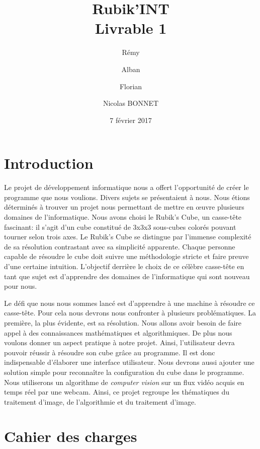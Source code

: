\documentclass[a4paper]{report}
\title{Rubik'INT \\ Livrable 1}
\author{Rémy \bsc{ZIRNHELD} \and Alban \bsc{MANZANO} \and Florian \bsc{GRANTE} \and Nicolas {BONNET}}
\date{7 février 2017}
\begin{document}
\maketitle

\tableofcontents

\chapter*{Introduction}

Le projet de développement informatique nous a offert l'opportunité de créer le programme que nous voulions.
Divers sujets se présentaient à nous. Nous étions déterminés à trouver un projet nous permettant de mettre en œuvre plusieurs domaines de l'informatique.
Nous avons choisi le Rubik's Cube, un casse-tête fascinant: il s'agit d'un cube constitué de 3x3x3 sous-cubes colorés pouvant tourner selon trois axes.
Le Rubik's Cube se distingue par l'immense complexité de sa résolution contrastant avec sa simplicité apparente.
Chaque personne capable de résoudre le cube doit suivre une méthodologie stricte et faire preuve d'une certaine intuition.
L'objectif derrière le choix de ce célèbre casse-tête en tant que sujet est d'apprendre des domaines de l'informatique qui sont nouveau pour nous.

Le défi que nous nous sommes lancé est d'apprendre à une machine à résoudre ce casse-tête.
Pour cela nous devrons nous confronter à plusieurs problématiques.
La première, la plus évidente, est sa résolution. Nous allons avoir besoin de faire appel à des connaissances mathématiques et algorithmiques.
De plus nous voulons donner un aspect pratique à notre projet. Ainsi, l'utilisateur devra pouvoir réussir à résoudre son cube grâce au programme.
Il est donc indispensable d'élaborer une interface utilisateur.
Nous devrons aussi ajouter une solution simple pour reconnaître la configuration du cube dans le programme. Nous utiliserons un algorithme de \textit{computer vision} sur un flux vidéo acquis en temps réel par une webcam.
Ainsi, ce projet regroupe les thématiques du traitement d'image, de l'algorithmie et du traitement d'image.

\chapter{Cahier des charges}
\end{document}
